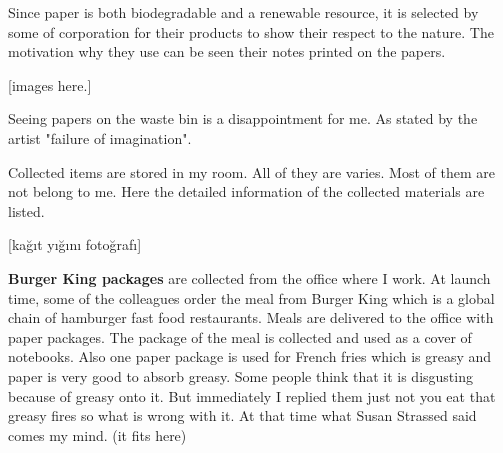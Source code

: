 
Since paper is both biodegradable and a renewable resource, it is selected by some of corporation for their products to show their respect to the nature. The motivation why they use can be seen their notes printed on the papers.

[images here.]

Seeing papers on the waste bin is a disappointment for me. As stated by the artist "failure of imagination".


Collected items are stored in my room. All of they are varies. Most of them are not belong to me. Here the detailed information of the collected materials are listed.

[kağıt yığını fotoğrafı]

\textbf{Burger King packages} are collected from the office where I work. At launch time, some of the colleagues order the meal from Burger King which is a global chain of hamburger fast food restaurants. Meals are delivered to the office with paper packages. The package of the meal is collected and used as a cover of notebooks. Also one paper package is used for French fries which is greasy and paper is very good to absorb greasy. Some people think that it is disgusting because of greasy onto it. But immediately I replied them just not you eat that greasy fires so what is wrong with it. At that time what Susan Strassed said comes my mind. (it fits here)

